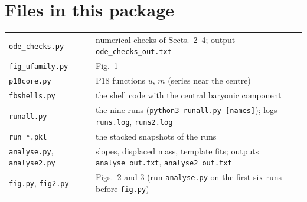 \documentclass[11pt,a4paper]{article}
\theoremstyle{remark}
\begin{document}
\section*{Files in this package}
\begin{small}
\begin{tabular}{@{}lp{}@{}}
\texttt{ode\_checks.py} & numerical checks of Sects.~2--4; output \texttt{ode\_checks\_out.txt}\\
\texttt{fig\_ufamily.py} & Fig.~1\\
\texttt{p18core.py} & P18 functions $u$, $m$ (series near the centre)\\
\texttt{fbshells.py} & the shell code with the central baryonic component\\
\texttt{runall.py} & the nine runs (\texttt{python3 runall.py [names]}); logs \texttt{runs.log}, \texttt{runs2.log}\\
\texttt{run\_*.pkl} & the stacked snapshots of the runs\\
\texttt{analyse.py}, \texttt{analyse2.py} & slopes, displaced mass, template fits; outputs \texttt{analyse\_out.txt}, \texttt{analyse2\_out.txt}\\
\texttt{fig.py}, \texttt{fig2.py} & Figs.~2 and 3 (run \texttt{analyse.py} on the first six runs before \texttt{fig.py})\\
\end{tabular}
\end{small}
\end{document}
